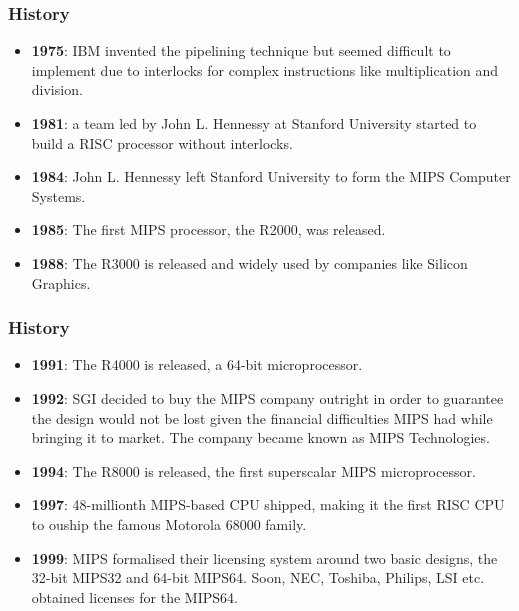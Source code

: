 
\begin{frame}
  \frametitle{History}

  \begin{itemize}[<+->]
    \item
      \textbf{1975}: IBM invented the pipelining technique but seemed
      difficult to implement due to interlocks for complex instructions like
      multiplication and division.
    \item
      \textbf{1981}: a team led by John L. Hennessy at Stanford University
      started to build a RISC processor without interlocks.
    \item
      \textbf{1984}: John L. Hennessy left Stanford University to form
      the MIPS Computer Systems.
    \item
      \textbf{1985}: The first MIPS processor, the R2000, was released.
    \item
      \textbf{1988}: The R3000 is released and widely used by companies like
      Silicon Graphics.
  \end{itemize}
\end{frame}


\begin{frame}
  \frametitle{History}

  \begin{itemize}[<+->]
    \item
      \textbf{1991}: The R4000 is released, a 64-bit microprocessor.
    \item
      \textbf{1992}: SGI decided to buy the MIPS company outright in order
      to guarantee the design would not be lost given the financial
      difficulties MIPS had while bringing it to market. The company became
      known as MIPS Technologies.
    \item
      \textbf{1994}: The R8000 is released, the first superscalar
      MIPS microprocessor.
    \item
      \textbf{1997}: 48-millionth MIPS-based CPU shipped, making it the
      first RISC CPU to ouship the famous Motorola 68000 family.
    \item
      \textbf{1999}: MIPS formalised their licensing system around two
      basic designs, the 32-bit MIPS32 and 64-bit MIPS64. Soon, NEC, Toshiba,
      Philips, LSI etc. obtained licenses for the MIPS64.
  \end{itemize}
\end{frame}

